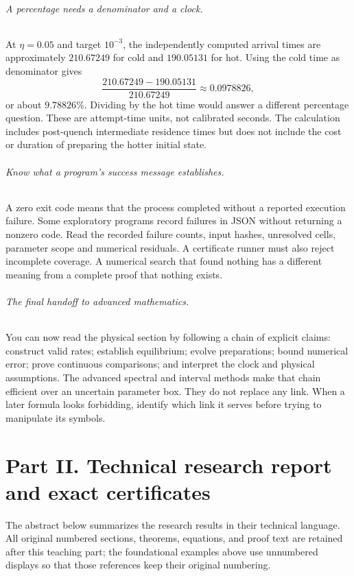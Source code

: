 \documentclass[11pt]{article}
\begin{document}
\paragraph{A percentage needs a denominator and a clock.}
At $\eta=0.05$ and target $10^{-3}$, the independently computed arrival
times are approximately $210.67249$ for cold and $190.05131$ for hot.
Using the cold time as denominator gives
\[
 \frac{210.67249-190.05131}{210.67249}\approx0.0978826,
\]
or about $9.78826\%$. Dividing by the hot time would answer a different
percentage question. These are attempt-time units, not calibrated seconds.
The calculation includes post-quench intermediate residence times but does
not include the cost or duration of preparing the hotter initial state.

\paragraph{Know what a program's success message establishes.}
A zero exit code means that the process completed without a reported
execution failure. Some exploratory programs record failures in JSON
without returning a nonzero code. Read the recorded failure counts, input
hashes, unresolved cells, parameter scope and numerical residuals. A
certificate runner must also reject incomplete coverage. A numerical
search that found nothing has a different meaning from a complete proof
that nothing exists.

\paragraph{The final handoff to advanced mathematics.}
You can now read the physical section by following a chain of explicit
claims: construct valid rates; establish equilibrium; evolve preparations;
bound numerical error; prove continuous comparisons; and interpret the
clock and physical assumptions. The advanced spectral and interval
methods make that chain efficient over an uncertain parameter box.
They do not replace any link. When a later formula looks forbidding,
identify which link it serves before trying to manipulate its symbols.


\clearpage
\part*{Part II. Technical research report and exact certificates}
\noindent The abstract below summarizes the research results in their technical
language. All original numbered sections, theorems, equations, and proof text
are retained after this teaching part; the foundational examples above use
unnumbered displays so that those references keep their original numbering.
\par\bigskip
\end{document}
